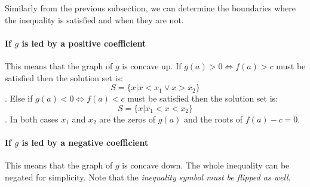 Similarly from the previous subsection, we can determine the boundaries where the inequality is satisfied and when they are not.

\paragraph{If $g$ is led by a positive coefficient}
This means that the graph of $g$ is concave up.
If $g(a) > 0 \iff f(a) > c$ must be satisfied then the solution set is: $$S = \{x | x < x_1 \lor x > x_2\}$$.
Else if $g(a) < 0 \iff f(a) < c$ must be satisfied then the solution set is: $$S = \{x | x_1 < x < x_2\}$$.
In both cases $x_1$ and $x_2$ are the zeros of $g(a)$ and the roots of $f(a) - c = 0$.

\paragraph{If $g$ is led by a negative coefficient}
This means that the graph of $g$ is concave down.
The whole inequality can be negated for simplicity.
Note that the \emph{inequality symbol must be flipped as well}.
